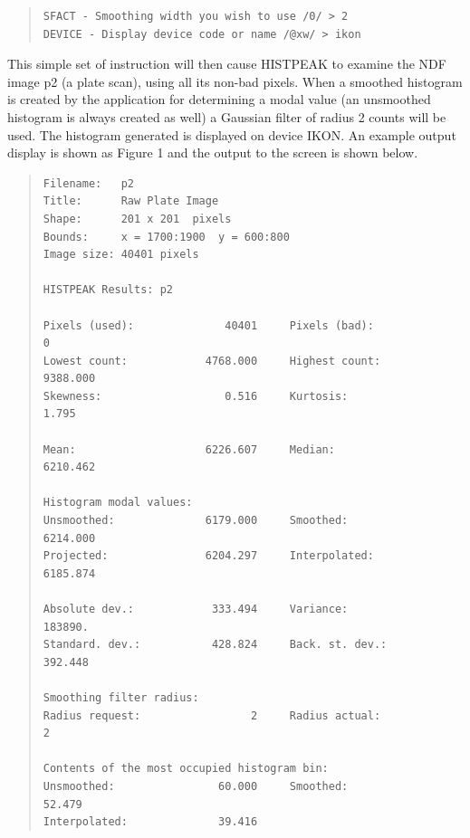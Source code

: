 \documentclass[twoside,11pt]{article}
\newenvironment{myquote}{\begin{quote}\begin{small}}{\end{small}\end{quote}}
\begin{document}
\begin{myquote}
\begin{verbatim}
SFACT - Smoothing width you wish to use /0/ > 2
DEVICE - Display device code or name /@xw/ > ikon
\end{verbatim}
\end{myquote}

This simple set of instruction will then cause HISTPEAK to examine the
NDF image p2 (a plate scan), using all its non-bad pixels. When a smoothed
histogram is created by the application for determining a modal value (an
unsmoothed histogram is always
created as well) a Gaussian filter of radius 2 counts will be used. The
histogram generated is displayed on device IKON. An example output display
is shown as Figure 1 and the output to the screen is shown below.

\begin{myquote}
\begin{verbatim}
Filename:   p2
Title:      Raw Plate Image
Shape:      201 x 201  pixels
Bounds:     x = 1700:1900  y = 600:800
Image size: 40401 pixels

HISTPEAK Results: p2

Pixels (used):              40401     Pixels (bad):                0
Lowest count:            4768.000     Highest count:        9388.000
Skewness:                   0.516     Kurtosis:                1.795

Mean:                    6226.607     Median:               6210.462

Histogram modal values:
Unsmoothed:              6179.000     Smoothed:             6214.000
Projected:               6204.297     Interpolated:         6185.874

Absolute dev.:            333.494     Variance:              183890.
Standard. dev.:           428.824     Back. st. dev.:        392.448

Smoothing filter radius:
Radius request:                 2     Radius actual:               2

Contents of the most occupied histogram bin:
Unsmoothed:                60.000     Smoothed:               52.479
Interpolated:              39.416
\end{verbatim}
\end{myquote}
\end{document}
